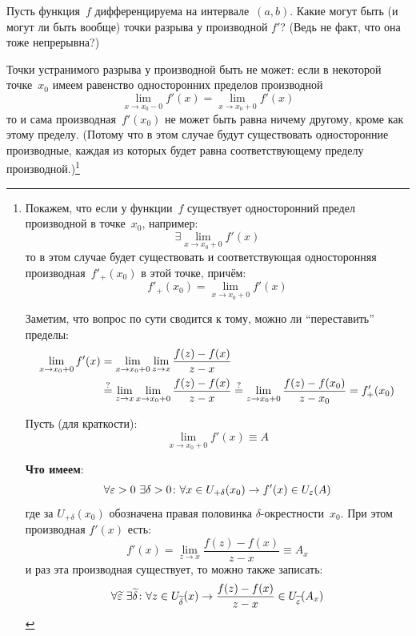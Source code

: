 \documentclass[a4paper,12pt]{article}
\begin{document}
  \begin{remark}
    Пусть функция~$f$ дифференцируема на интервале~$(a, b)$.
    Какие могут быть (и могут ли быть вообще) точки разрыва у производной $f'$?
    (Ведь не факт, что она тоже непрерывна?)

    Точки устранимого разрыва у производной быть не может: если в некоторой точке~$x_0$ имеем равенство односторонних пределов производной
    \[
      \lim_{x \to x_0 - 0} f'(x) = \lim_{x \to x_0 + 0} f'(x)
    \]
    то и сама производная~$f'(x_0)$ не может быть равна ничему другому, кроме как этому пределу.
    (Потому что в этом случае будут существовать односторонние производные, каждая из которых будет равна соответствующему пределу производной.)\footnote{
      Покажем, что если у функции~$f$ существует односторонний предел производной в точке~$x_0$, например:
      \[
        \exists \lim_{x \to x_0 + 0} f'(x)
      \]
      то в этом случае будет существовать и соответствующая односторонняя производная~$f'_+(x_0)$ в этой точке, причём:
      \[
        f'_+(x_0) = \lim_{x \to x_0 + 0} f'(x)
      \]

      Заметим, что вопрос по сути сводится к тому, можно ли ``переставить'' пределы:
      \begin{equation*}
      \begin{split}
        \lim_{x \to x_0 + 0} f'(x) &= \lim_{x \to x_0 + 0} \lim_{z \to x} \frac{f(z) - f(x)}{z - x}\\
          &\overset{\operatorname{?}}{=} \lim_{z \to x} \lim_{x \to x_0 + 0} \frac{f(z) - f(x)}{z - x}
          \overset{\operatorname{?}}{=} \lim_{z \to x_0 + 0} \frac{f(z) - f(x_0)}{z - x_0}
          = f'_+(x_0)
      \end{split}
      \end{equation*}

      Пусть (для краткости):
      \[
        \lim_{x \to x_0 + 0} f'(x) \equiv A
      \]

      \textbf{Что имеем}:
      \[
        \forall \varepsilon > 0\ \exists \delta > 0\colon \forall x \in U_{+\delta}(x_0) \to f'(x) \in U_{\varepsilon}(A)
      \]
      где за $U_{+\delta}(x_0)$ обозначена правая половинка $\delta$-окрестности~$x_0$.
      При этом производная $f'(x)$ есть:
      \[
        f'(x) = \lim_{z \to x} \frac{f(z) - f(x)}{z - x} \equiv A_x
      \]
      и раз эта производная существует, то можно также записать:
      \[
        \forall \widetilde {\varepsilon}\ \exists \widetilde \delta\colon \forall z \in U_{\widetilde \delta}(x) \to \frac{f(z) - f(x)}{z - x} \in U_{\widetilde {\varepsilon}}(A_x)
      \]

}
\end{remark}
\end{document}
